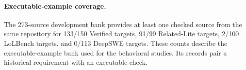 \paragraph{Executable-example coverage.}
The 273-source development bank provides at least one checked source from the
same repository for 133/150 Verified targets, 91/99 Related-Lite targets,
2/100 LoLBench targets, and 0/113 DeepSWE targets. These counts describe the
executable-example bank used for the behavioral studies. Its records pair a
historical requirement with an executable check.
